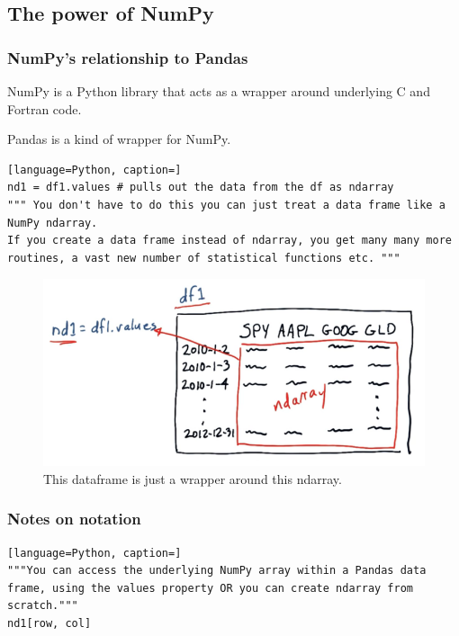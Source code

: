 \documentclass[12pt]{article}
\begin{document}
\subsection{The power of NumPy}

\subsubsection{NumPy's relationship to Pandas}

NumPy is a Python library that acts as a wrapper around underlying C and Fortran code.

Pandas is a kind of wrapper for NumPy.

\begin{lstlisting}[language=Python, caption=]
nd1 = df1.values # pulls out the data from the df as ndarray
""" You don't have to do this you can just treat a data frame like a NumPy ndarray.
If you create a data frame instead of ndarray, you get many many more routines, a vast new number of statistical functions etc. """
\end{lstlisting}

\begin{figure}[!ht]
\centering
\includegraphics[scale=0.4]{fig/fig7}
\caption{This dataframe is just a wrapper around this ndarray.}
\end{figure}

\subsubsection{Notes on notation}

\begin{lstlisting}[language=Python, caption=]
"""You can access the underlying NumPy array within a Pandas data frame, using the values property OR you can create ndarray from scratch."""
nd1[row, col]
\end{lstlisting}
\end{document}
